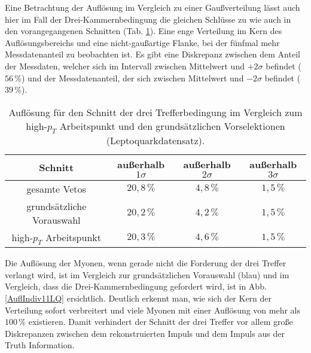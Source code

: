 Eine Betrachtung der Auflösung im Ver\-gleich zu einer Gaußverteilung lässt auch hier im Fall der Drei-Kammernbedingung die gleichen Schlüsse zu wie auch in den vorangegangenen Schnitten (Tab. \ref{123sigmaIndiv4LQ}). Eine enge Verteilung im Kern des Auflösungsbereichs und eine nicht-gaußartige Flanke, bei der fünfmal mehr Messdatenanteil zu beobachten ist. Es gibt eine Diskrepanz zwischen dem Anteil der Messdaten, welcher sich im In\-ter\-vall zwischen Mittelwert und $+2\sigma$ befindet ($56\,\%$) und der Messdatenanteil, der sich zwischen Mittelwert und $-2\sigma$ befindet ($39\,\%$). 
\begin{table}[htbp]
		\centering
		\begin{tabular*}{\linewidth}{@{\extracolsep{\fill}}cccc}
		\hline
		\hline
		\rule[-7pt]{0pt}{23pt} Schnitt & außerhalb $1\sigma$ & außerhalb $2\sigma$ & außerhalb $3\sigma$
		\\
		\hline
		\rule[-6pt]{0pt}{21pt} gesamte Vetos               & \(20,8\,\%\) & $4,8\,\%$ & $1,5\,\%$
		\\
		\rule[-6pt]{0pt}{21pt} grundsätzliche Vorauswahl   &  \(20,2\,\%\)	& $4,2\,\%$ & $1,5\,\%$
		\\
		\rule[-6pt]{0pt}{21pt} high-$p_T$ Arbeitspunkt     &  \(20,3\,\%\)	& $4,6\,\%$ & $1,5\,\%$
		\\
		\hline
		\hline
		\end{tabular*}
		\caption[Auflösung für den Schnitt der drei Trefferbedingung den Leptoquarkdatensatz]{Auflösung für den Schnitt der drei Trefferbedingung im Vergleich zum high-$p_T$ Arbeitspunkt und den grundsätz\-lichen Vor\-selektionen (Leptoquarkdatensatz).}
		\label{123sigmaIndiv4LQ}
	\end{table}
Die Auflösung der Myonen, wenn gerade nicht die Forderung der drei Treffer verlangt wird, ist im Vergleich zur grundsätzlichen Vor\-aus\-wahl (blau) und im Vergleich, dass die Drei-Kammernbedingung gefordert wird, ist in Abb. \ref{AuflIndiv11LQ} ersichtlich. Deutlich erkennt man, wie sich der Kern der Verteilung sofort verbreitert und viele Myonen mit einer Auflösung von mehr als $100\,\%$ existieren. Damit verhindert der Schnitt der drei Treffer vor allem große Diskrepanzen zwischen dem rekonstruierten Impuls und dem Impuls aus der Truth Information. 


